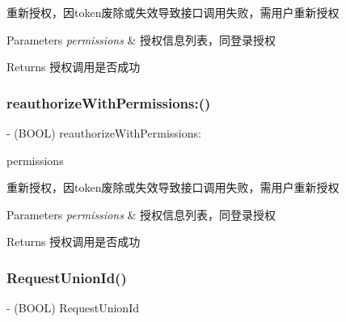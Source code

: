 重新授权，因token废除或失效导致接口调用失败，需用户重新授权 
\begin{DoxyParams}{Parameters}
{\em permissions} & 授权信息列表，同登录授权 \\
\hline
\end{DoxyParams}
\begin{DoxyReturn}{Returns}
授权调用是否成功 
\end{DoxyReturn}
\mbox{\label{interface_tencent_o_auth_a0cae2d11a0ac52e1877a05c05100669d}} 
\subsubsection{\texorpdfstring{reauthorize\+With\+Permissions\+:()}{reauthorizeWithPermissions:()}\hspace{0.1cm}{\footnotesize\ttfamily [2/2]}}
{\footnotesize\ttfamily -\/ (B\+O\+OL) reauthorize\+With\+Permissions\+: \begin{DoxyParamCaption}\item[{(N\+S\+Array $\ast$)}]{permissions }\end{DoxyParamCaption}}

重新授权，因token废除或失效导致接口调用失败，需用户重新授权 
\begin{DoxyParams}{Parameters}
{\em permissions} & 授权信息列表，同登录授权 \\
\hline
\end{DoxyParams}
\begin{DoxyReturn}{Returns}
授权调用是否成功 
\end{DoxyReturn}
\mbox{\label{interface_tencent_o_auth_a8161f0a4e6a3398ecae478e515915e3a}} 
\subsubsection{\texorpdfstring{Request\+Union\+Id()}{RequestUnionId()}\hspace{0.1cm}{\footnotesize\ttfamily [1/2]}}
{\footnotesize\ttfamily -\/ (B\+O\+OL) Request\+Union\+Id \begin{DoxyParamCaption}{ }\end{DoxyParamCaption}}

